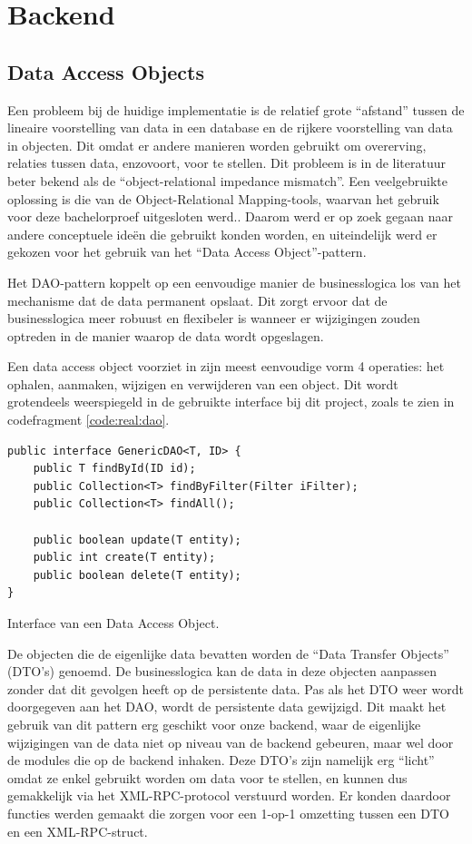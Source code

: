 %
%

\chapter{Backend}

\section{Data Access Objects}

Een probleem bij de huidige implementatie is de relatief grote ``afstand'' tussen de lineaire voorstelling van data in een database en de rijkere voorstelling van data in objecten. Dit omdat er andere manieren worden gebruikt om overerving, relaties tussen data, enzovoort, voor te stellen. Dit probleem is in de literatuur beter bekend als de ``object-relational impedance mismatch''. Een veelgebruikte oplossing is die van de Object-Relational Mapping-tools, waarvan het gebruik voor deze bachelorproef uitgesloten werd.. Daarom werd er op zoek gegaan naar andere conceptuele ide\"en die gebruikt konden worden, en uiteindelijk werd er gekozen voor het gebruik van het ``Data Access Object''-pattern.

Het DAO-pattern koppelt op een eenvoudige manier de businesslogica los van het mechanisme dat de data permanent opslaat. Dit zorgt ervoor dat de businesslogica meer robuust en flexibeler is wanneer er wijzigingen zouden optreden in de manier waarop de data wordt opgeslagen.

Een data access object voorziet in zijn meest eenvoudige vorm 4 operaties: het ophalen, aanmaken, wijzigen en verwijderen van een object. Dit wordt grotendeels weerspiegeld in de gebruikte interface bij dit project, zoals te zien in codefragment \ref{code:real:dao}.

\begin{code}
\lstset{language=Java,style=Java}
\begin{lstlisting}
public interface GenericDAO<T, ID> {
    public T findById(ID id);
    public Collection<T> findByFilter(Filter iFilter);
    public Collection<T> findAll();

    public boolean update(T entity);
    public int create(T entity);
    public boolean delete(T entity);
}
\end{lstlisting}
\caption{Interface van een Data Access Object.}
\label{code:real:dao}
\end{code}

De objecten die de eigenlijke data bevatten worden de ``Data Transfer Objects'' (DTO's) genoemd. De businesslogica kan de data in deze objecten aanpassen zonder dat dit gevolgen heeft op de persistente data. Pas als het DTO weer wordt doorgegeven aan het DAO, wordt de persistente data gewijzigd. Dit maakt het gebruik van dit pattern erg geschikt voor onze backend, waar de eigenlijke wijzigingen van de data niet op niveau van de backend gebeuren, maar wel door de modules die op de backend inhaken. Deze DTO's zijn namelijk erg ``licht'' omdat ze enkel gebruikt worden om data voor te stellen, en kunnen dus gemakkelijk via het XML-RPC-protocol verstuurd worden. Er konden daardoor functies werden gemaakt die zorgen voor een 1-op-1 omzetting tussen een DTO en een XML-RPC-struct.

